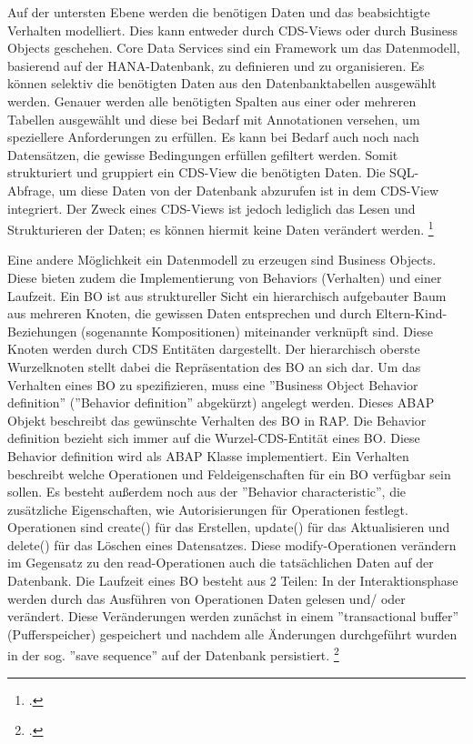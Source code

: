 Auf der untersten Ebene werden die benötigen Daten und das beabsichtigte Verhalten modelliert. Dies kann entweder durch CDS-Views oder durch Business Objects geschehen. Core Data Services sind ein Framework um das Datenmodell, basierend auf der HANA-Datenbank, zu definieren und zu organisieren. Es können selektiv die benötigten Daten aus den Datenbanktabellen ausgewählt werden. Genauer werden alle benötigten Spalten aus einer oder mehreren Tabellen ausgewählt und diese bei Bedarf  mit Annotationen versehen, um speziellere Anforderungen zu erfüllen. Es kann bei Bedarf auch noch nach Datensätzen, die gewisse Bedingungen erfüllen gefiltert werden. Somit strukturiert und gruppiert ein CDS-View die benötigten Daten. Die SQL-Abfrage, um diese Daten von der Datenbank abzurufen ist in dem CDS-View integriert. Der Zweck eines CDS-Views ist jedoch lediglich das Lesen und Strukturieren der Daten; es können hiermit keine Daten verändert werden. \footcite[Vgl.][]{sap_rap_2023}

Eine andere Möglichkeit ein Datenmodell zu erzeugen sind Business Objects. Diese bieten zudem die Implementierung von Behaviors (Verhalten) und einer Laufzeit. Ein BO ist aus struktureller Sicht ein hierarchisch aufgebauter Baum aus mehreren Knoten, die gewissen Daten entsprechen und durch Eltern-Kind-Beziehungen (sogenannte Kompositionen) miteinander verknüpft sind. Diese Knoten werden durch CDS Entitäten dargestellt. Der hierarchisch oberste Wurzelknoten stellt dabei die Repräsentation des BO an sich dar. Um das Verhalten eines BO zu spezifizieren, muss eine ''Business Object Behavior definition'' (''Behavior definition'' abgekürzt) angelegt werden. Dieses ABAP Objekt beschreibt das gewünschte Verhalten des BO in RAP. Die Behavior definition bezieht sich immer auf die Wurzel-CDS-Entität eines BO. Diese Behavior definition wird als ABAP Klasse implementiert. Ein Verhalten beschreibt welche Operationen und Feldeigenschaften für ein BO verfügbar sein sollen. Es besteht au{\ss}erdem noch aus der ''Behavior characteristic'', die zusätzliche Eigenschaften, wie \zB Autorisierungen für Operationen festlegt. Operationen sind \zB create() für das Erstellen, update() für das Aktualisieren und delete() für das Löschen eines Datensatzes. Diese modify-Operationen verändern im Gegensatz zu den read-Operationen auch die tatsächlichen Daten auf der Datenbank. Die Laufzeit eines BO besteht aus 2 Teilen: In der Interaktionsphase werden durch das Ausführen von Operationen Daten gelesen und/ oder verändert. Diese Veränderungen werden zunächst in einem ''transactional buffer'' (Pufferspeicher) gespeichert und nachdem alle Änderungen durchgeführt wurden in der sog. ''save sequence'' auf der Datenbank persistiert. \footcite[Vgl.][]{sap_rap_2023}

